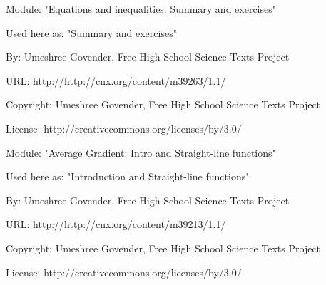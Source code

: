       \par\vspace{9pt}\noindent\begin{minipage}{\textwidth}
      Module: "Equations and inequalities: Summary and exercises" \par\nopagebreak\noindent
      Used here as: "Summary and exercises" \par\nopagebreak\noindent
        By: Umeshree Govender, Free High School Science Texts Project\par\nopagebreak\noindent
      URL: http://http://cnx.org/content/m39263/1.1/\par\nopagebreak\noindent
      \par\nopagebreak\noindent
      Copyright: Umeshree Govender, Free High School Science Texts Project\par\nopagebreak\noindent
      License:  http://creativecommons.org/licenses/by/3.0/\par\nopagebreak\noindent
      \par\end{minipage}
      \par\vspace{9pt}\noindent\begin{minipage}{\textwidth}
      Module: "Average Gradient: Intro and Straight-line functions" \par\nopagebreak\noindent
      Used here as: "Introduction and Straight-line functions" \par\nopagebreak\noindent
        By: Umeshree Govender, Free High School Science Texts Project\par\nopagebreak\noindent
      URL: http://http://cnx.org/content/m39213/1.1/\par\nopagebreak\noindent
      \par\nopagebreak\noindent
      Copyright: Umeshree Govender, Free High School Science Texts Project\par\nopagebreak\noindent
      License:  http://creativecommons.org/licenses/by/3.0/\par\nopagebreak\noindent
      \par\end{minipage}
